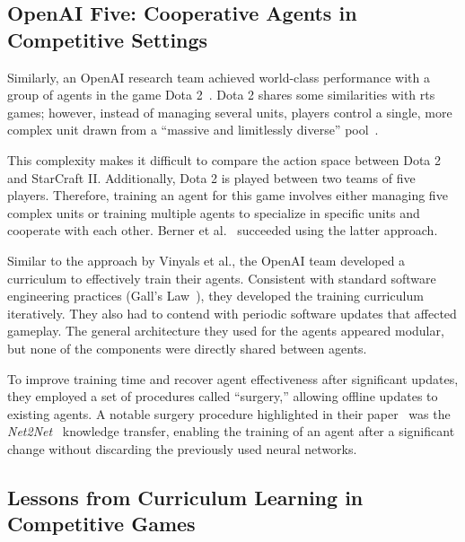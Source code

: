     \subsection*{OpenAI Five: Cooperative Agents in Competitive Settings}

Similarly, an OpenAI research team achieved world-class performance 
with a group of agents in the game Dota 2~\cite{berner2019}. 
Dota 2 shares some similarities with \gls{rts} games; 
however, instead of managing several units, players control a single, 
more complex unit drawn from a ``massive and limitlessly diverse''
pool~\cite{zotero-2643}.

This complexity makes it difficult to compare the action space between 
Dota 2 and StarCraft II. Additionally, Dota 2 is played between two 
teams of five players. Therefore, training an agent for this game 
involves either managing five complex units or training multiple agents 
to specialize in specific units and cooperate with each other. 
Berner et al.~\cite{berner2019} succeeded using the latter approach.

Similar to the approach by Vinyals et al., the OpenAI team developed 
a curriculum to effectively train their agents. Consistent with 
standard software engineering practices (Gall's Law~\cite{gall1975}), 
they developed the training curriculum iteratively.
%
They also had to contend with periodic software updates that affected gameplay.
The general architecture they used for the agents appeared modular, 
but none of the components were directly shared between agents.

To improve training time and recover agent effectiveness after 
significant updates, they employed a set of procedures called 
``surgery,'' allowing offline updates to existing agents. 
A notable surgery procedure highlighted in their paper~\cite{berner2019} 
was the \emph{Net2Net}~\cite{chen2016} knowledge transfer, 
enabling the training of an agent after a significant change 
without discarding the previously used neural networks.

    \subsection*{Lessons from Curriculum Learning in Competitive Games}

